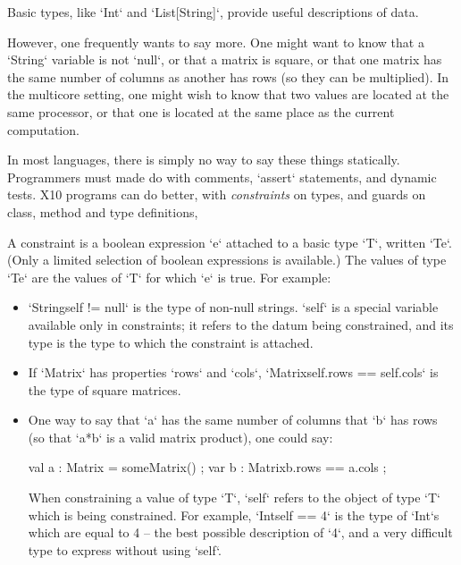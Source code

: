 

Basic types, like \xcd`Int` and \xcd`List[String]`, provide useful
descriptions of data.  

However, one frequently wants to say more.  One might want to know
that a \xcd`String` variable is not \xcd`null`, or that a matrix is
square, or that one matrix has the same number of columns as another
has rows (so they can be multiplied).  In the multicore setting, one
might wish to know that two values are located at the same processor,
or that one is located at the same place as the current computation.

In most languages, there is simply no way to say these things
statically.  Programmers must made do with comments, \xcd`assert`
statements, and dynamic tests.  X10 programs can do better, with {\em
  constraints} on types, and guards on class, method and type
definitions,

A constraint is a boolean expression \xcd`e` attached to a basic type \xcd`T`,
written \xcd`T{e}`.  (Only a limited selection of boolean expressions is
available.)  The values of type \xcd`T{e}` are the values of \xcd`T` for which
\xcd`e` is true.  For example: 

\begin{itemize}
\item \xcd`String{self != null}` is the type of non-null strings.  \xcd`self`
      is a special variable available only in constraints; it refers to the
      datum being constrained, and its type is the type to which the
      constraint is attached.
\item If \xcd`Matrix` has properties \xcd`rows` and \xcd`cols`, 
      \xcd`Matrix{self.rows == self.cols}` is the type of square matrices.
\item One way to say that \xcd`a` has the same number of columns that \xcd`b`
      has rows (so that \xcd`a*b` is a valid matrix product), one could say: 
\begin{xten}
  val a : Matrix = someMatrix() ;
  var b : Matrix{b.rows == a.cols} ;
\end{xten}



When constraining a value of type \xcd`T`, \xcd`self` refers to the object of
type \xcd`T` which is being constrained.  For example, \xcd`Int{self == 4}` is
the type of \xcd`Int`s which are equal to 4 -- the best possible description
of \xcd`4`, and a very difficult type to express without using \xcd`self`.  
\end{itemize}

